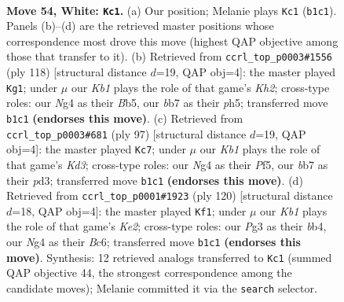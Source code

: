 \documentclass[11pt]{article}
\begin{document}
\clearpage

\begin{figure}[p]\centering
\begin{subfigure}{0.46\textwidth}\centering
\resizebox{\linewidth}{!}{%
\newchessgame
\chessboard[
  setfen={5n2/kb6/8/8/p2p2N1/P5P1/1PP5/1K6 w - - 26 54},
  showmover=false,
  pgfstyle=straightmove, color=movearrow, markmove={b1-c1}
]}
\caption{}
\end{subfigure}\hfill
\begin{subfigure}{0.46\textwidth}\centering
\resizebox{\linewidth}{!}{%
\newchessgame
\chessboard[
  setfen={8/4b3/4P2k/1B2p2p/4Pp2/5P2/6PK/8 w - - 1 60},
  showmover=false,
  pgfstyle=straightmove, color=movearrow, markmove={h2-g1}
]}
\caption{}
\end{subfigure}
\\[4pt]
\begin{subfigure}{0.46\textwidth}\centering
\resizebox{\linewidth}{!}{%
\newchessgame
\chessboard[
  setfen={8/8/3k2p1/2p1pp2/P6P/3P2P1/4K3/8 b - - 0 49},
  showmover=false,
  pgfstyle=straightmove, color=movearrow, markmove={d6-c7}
]}
\caption{}
\end{subfigure}\hfill
\begin{subfigure}{0.46\textwidth}\centering
\resizebox{\linewidth}{!}{%
\newchessgame
\chessboard[
  setfen={8/5k2/2B1p3/4p3/1b5p/4P2P/4KP2/8 w - - 22 61},
  showmover=false,
  pgfstyle=straightmove, color=movearrow, markmove={e2-f1}
]}
\caption{}
\end{subfigure}
\caption{\textbf{Move 54, White: \texttt{Kc1}.} (a) Our position; Melanie plays \texttt{Kc1} (\texttt{b1c1}). Panels (b)--(d) are the retrieved master positions whose correspondence most drove this move (highest QAP objective among those that transfer to it). (b) Retrieved from \texttt{ccrl\_top\_p0003\#1556} (ply 118) [structural distance $d$=19, QAP obj=4]: the master played \texttt{Kg1}; under $\mu$ our \emph{Kb1} plays the role of that game's \emph{Kh2}; cross-type roles: our \emph{N}g4 as their \emph{B}b5, our \emph{b}b7 as their \emph{p}h5; transferred move \texttt{b1c1} \textbf{(endorses this move)}. (c) Retrieved from \texttt{ccrl\_top\_p0003\#681} (ply 97) [structural distance $d$=19, QAP obj=4]: the master played \texttt{Kc7}; under $\mu$ our \emph{Kb1} plays the role of that game's \emph{Kd3}; cross-type roles: our \emph{N}g4 as their \emph{P}f5, our \emph{b}b7 as their \emph{p}d3; transferred move \texttt{b1c1} \textbf{(endorses this move)}. (d) Retrieved from \texttt{ccrl\_top\_p0001\#1923} (ply 120) [structural distance $d$=18, QAP obj=4]: the master played \texttt{Kf1}; under $\mu$ our \emph{Kb1} plays the role of that game's \emph{Ke2}; cross-type roles: our \emph{P}g3 as their \emph{b}b4, our \emph{N}g4 as their \emph{B}c6; transferred move \texttt{b1c1} \textbf{(endorses this move)}. Synthesis: 12 retrieved analogs transferred to \texttt{Kc1} (summed QAP objective 44, the strongest correspondence among the candidate moves); Melanie committed it via the \texttt{search} selector.}
\label{fig:thought-m106}
\end{figure}
\end{document}
